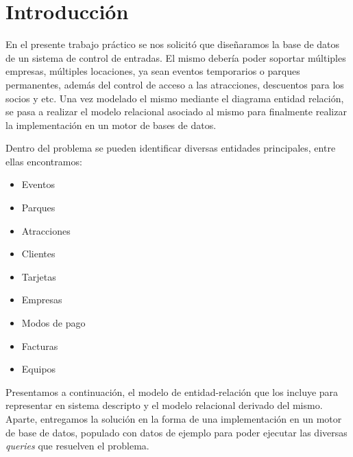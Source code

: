 \section{Introducción}
En el presente trabajo práctico se nos solicitó que diseñaramos la base de datos de un sistema de control de entradas. El mismo debería poder soportar múltiples empresas, múltiples locaciones, ya sean eventos temporarios o parques permanentes, además del control de acceso a las atracciones, descuentos para los socios y etc.
Una vez modelado el mismo mediante el diagrama entidad relación, se pasa a realizar el modelo relacional asociado al mismo para finalmente realizar la implementación en un motor de bases de datos.

Dentro del problema se pueden identificar diversas entidades principales,
entre ellas encontramos: 

\begin{itemize}
\item Eventos
\item Parques
\item Atracciones
\item Clientes
\item Tarjetas
\item Empresas
\item Modos de pago
\item Facturas
\item Equipos
\end{itemize}


Presentamos a continuación, el modelo de entidad-relación que los incluye para representar en sistema descripto y el modelo relacional derivado del mismo. Aparte, entregamos la solución en la forma de una implementación en un motor de base de datos, populado con datos de ejemplo para poder ejecutar las diversas \textit{queries} que resuelven el problema.
